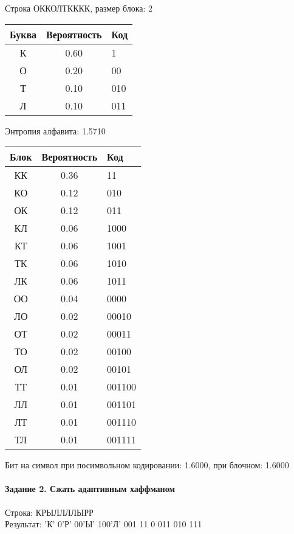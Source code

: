 \documentclass[a4paper, 12pt]{article}
\begin{document}
Строка ОККОЛТКККК, размер блока: 2
\begin{center}
 \begin{tabular}{ |c|c|l| } 
  \hline
     Буква & Вероятность & Код\\ \hline
К & 0.60 & 1\\\hline
О & 0.20 & 00\\\hline
Т & 0.10 & 010\\\hline
Л & 0.10 & 011
\\ \hline \end{tabular}
\end{center}
Энтропия алфавита: 1.5710
\begin{center}
 \begin{tabular}{ |c|c|l| } 
  \hline
     Блок & Вероятность & Код\\ \hline
КК & 0.36 & 11\\\hline
КО & 0.12 & 010\\\hline
ОК & 0.12 & 011\\\hline
КЛ & 0.06 & 1000\\\hline
КТ & 0.06 & 1001\\\hline
ТК & 0.06 & 1010\\\hline
ЛК & 0.06 & 1011\\\hline
ОО & 0.04 & 0000\\\hline
ЛО & 0.02 & 00010\\\hline
ОТ & 0.02 & 00011\\\hline
ТО & 0.02 & 00100\\\hline
ОЛ & 0.02 & 00101\\\hline
ТТ & 0.01 & 001100\\\hline
ЛЛ & 0.01 & 001101\\\hline
ЛТ & 0.01 & 001110\\\hline
ТЛ & 0.01 & 001111
\\ \hline \end{tabular}
\end{center}
Бит на символ при посимвольном кодировании: 1.6000, при блочном: 1.6000


\pagebreak
\paragraph{Задание 2. Сжать адаптивным хаффманом\\}

Строка: 
КРЫЛЛЛЛЫРР\\
Результат: 'К' 0'Р' 00'Ы' 100'Л' 001 11 0 011 010 111
\end{document}
